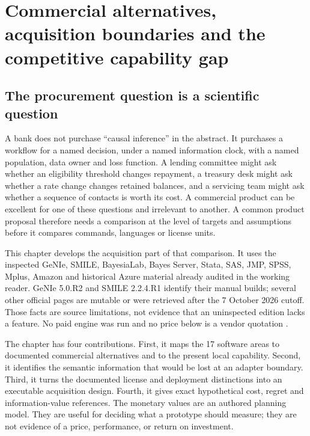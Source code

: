 \chapter{Commercial alternatives, acquisition boundaries and the competitive capability gap}
\label{exec17:s8}

\section{The procurement question is a scientific question}
\label{exec17:s8-question}

A bank does not purchase ``causal inference'' in the abstract. It purchases a
workflow for a named decision, under a named information clock, with a named
population, data owner and loss function. A lending committee might ask whether
an eligibility threshold changes repayment, a treasury desk might ask whether a
rate change changes retained balances, and a servicing team might ask whether a
sequence of contacts is worth its cost. A commercial product can be excellent
for one of these questions and irrelevant to another. A common product proposal
therefore needs a comparison at the level of targets and assumptions before it
compares commands, languages or license units.

This chapter develops the acquisition part of that comparison. It uses the inspected GeNIe,
SMILE, BayesiaLab, Bayes Server, Stata, SAS, JMP, SPSS, Mplus, Amazon and
historical Azure material already audited in the working reader. GeNIe 5.0.R2
and SMILE 2.2.4.R1 identify their manual builds; several other official pages
are mutable or were retrieved after the 7 October 2026 cutoff. Those facts are
source limitations, not evidence that an uninspected edition lacks a feature.
No paid engine was run and no price below is a vendor quotation
\citep{exec13_genie_readme,exec13_smile_intro,exec13_bayesia_api,
exec13_ci_bayesserver_causality,exec13_ci_stata_causal_intro}.

The chapter has four contributions. First, it maps the 17 software areas to
documented commercial alternatives and to the present local capability. Second,
it identifies the semantic information that would be lost at an adapter
boundary. Third, it turns the documented license and deployment distinctions
into an executable acquisition design. Fourth, it gives exact hypothetical
cost, regret and information-value references. The monetary values are an
authored planning model. They are useful for deciding what a prototype should
measure; they are not evidence of a price, performance, or return on investment.

